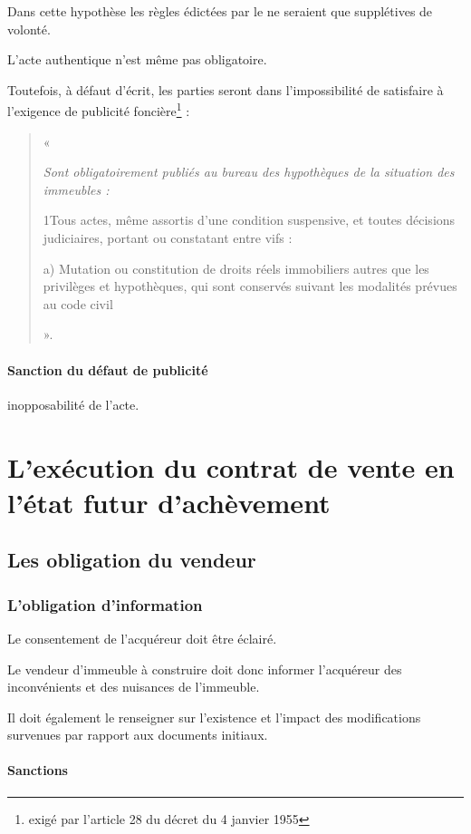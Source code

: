 			Dans cette hypothèse les règles édictées par le \cch ne seraient que supplétives de volonté.

			L’acte authentique n’est même pas obligatoire.

			\bigbreak Toutefois, à défaut d’écrit, les parties seront dans l’impossibilité de satisfaire à l’exigence de publicité foncière\footnote{exigé par l’article 28 du décret du 4 janvier 1955} :

			\begin{quote}
				« {\itshape Sont obligatoirement publiés au bureau des hypothèques de la situation des immeubles :

				1\degres Tous actes, même assortis d'une condition suspensive, et toutes décisions judiciaires, portant ou constatant entre vifs :

				a) Mutation ou constitution de droits réels immobiliers autres que les privilèges et hypothèques, qui sont conservés suivant les modalités prévues au code civil} ».
			\end{quote}

			\paragraph{Sanction du défaut de publicité} inopposabilité de l’acte.


\section{L'exécution du contrat de vente en l'état futur d'achèvement}

	\subsection{Les obligation du vendeur}

		\subsubsection{L'obligation d'information}

			Le consentement de l’acquéreur doit être éclairé.

			Le vendeur d’immeuble à construire doit donc informer l’acquéreur des inconvénients et des nuisances de l’immeuble.

			Il doit également le renseigner sur l’existence et l’impact des modifications survenues par rapport aux documents initiaux.

			\paragraph{Sanctions}

